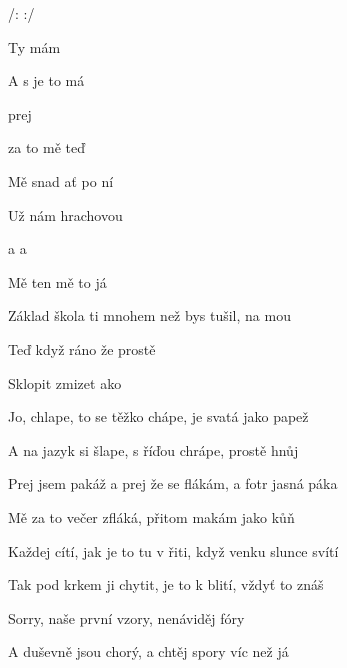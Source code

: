 

/:   :/ 

\zs
Ty    
mám   

A s   
je to  má     

  
prej   

 za to  
mě teď     
\ks

\zs

Mě snad    
ať  po ní  

Už  nám  
hrachovou      

  a  
a   

Mě   
ten mě  to já     

\ks

\zr
Základ škola ti  
mnohem  než bys tušil, na mou  

Teď  když ráno  
že prostě  

Sklopit  zmizet  ako 
\kr

\zs
Jo, chlape, to se těžko chápe, 
je svatá jako papež 

A na jazyk si šlape, 
s říďou chrápe, prostě hnůj 

Prej jsem pakáž a prej že se flákám, 
a fotr jasná páka 

Mě za to večer zfláká, 
přitom makám jako kůň 

\ks

\zs

Každej cítí, jak je to tu v řiti, 
když venku slunce svítí 

Tak pod krkem ji chytit, 
je to k blití, vždyť to znáš 

Sorry, naše první vzory, 
nenáviděj fóry 

A duševně jsou chorý, 
a chtěj spory víc než já 
\ks

